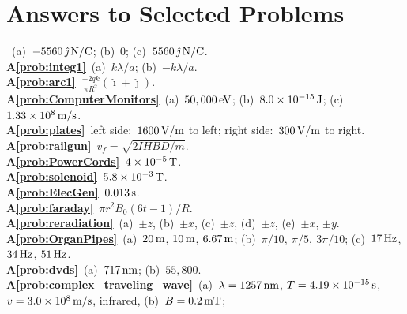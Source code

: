 \chapter*{Answers to Selected Problems}


~(a)~$-5560\, \hat \jmath \,\mbox{N/C}$; 
(b)~$0$; (c)~$5560\, \hat \jmath \,\mbox{N/C}$.\\
{\bf A\ref{prob:integ1}}~(a)~$k\lambda / a$; (b)~$-k\lambda / a$.\\
{\bf A\ref{prob:arc1}}~$\frac{-2qk}{\pi R^2}(\hat\imath + \hat\jmath)$.\\
{\bf A\ref{prob:ComputerMonitors}}~(a)~$50,000\,\mbox{eV}$; 
(b)~$8.0 \times 10^{-15}\,\mbox{J}$;
(c)~$1.33 \times 10^8\,\mbox{m/s}$.\\
{\bf A\ref{prob:plates}}~left side:~$1600\,\mbox{V/m}$ to left; 
right side:~$300\,\mbox{V/m}$ to right.\\
{\bf A\ref{prob:railgun}}~$v_f = \sqrt{2IHBD/m}$.\\
{\bf A\ref{prob:PowerCords}}~$4 \times 10^{-5}\,\mbox{T}$.\\
{\bf A\ref{prob:solenoid}}~$5.8 \times 10^{-3}\,\mbox{T}$.\\
{\bf A\ref{prob:ElecGen}}~$0.013\,\mbox{s}$.\\
{\bf A\ref{prob:faraday}}~$\pi r^2 B_0(6t-1)/R$.\\
{\bf A\ref{prob:reradiation}}~(a)~$\pm z$, (b)~$\pm x$, (c)~$\pm z$,
(d)~$\pm z$, (e)~$\pm x$, $\pm y$.\\
{\bf A\ref{prob:OrganPipes}}~(a)~$20\,\mbox{m}$, $10\,\mbox{m}$, $6.67\,\mbox{m}$; 
(b)~$\pi /10,\ \pi /5,\ 3\pi /10$; 
(c)~$17\,\mbox{Hz}$, $34\,\mbox{Hz}$, $51\,\mbox{Hz}$.\\
{\bf A\ref{prob:dvds}}~(a)~$717\,\mbox{nm}$; (b)~$55,800$.\\
{\bf A\ref{prob:complex_traveling_wave}}~(a)~$\lambda = 1257\,\mbox{nm}$, 
$T = 4.19\times 10^{-15}\,\mbox{s}$, $v = 3.0\times 10^8\,\mbox{m/s}$, infrared,
(b)~$B = 0.2\,\mbox{mT}$;\\
